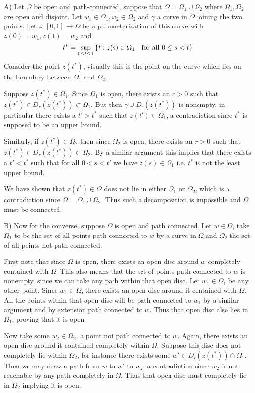 \begin{exercise}
	A) Let $\Omega$ be open and path-connected, suppose that $\Omega = \Omega_1 \cup \Omega_2$ where $\Omega_1, \Omega_2$ are open and disjoint. Let $w_1 \in \Omega_1, w_2 \in \Omega_2$ and $\gamma$ a curve in $\Omega$ joining the two points. Let $z: [0, 1] \to \Omega$ be a parameterization of this curve with $z(0) = w_1, z(1) = w_2$ and
	\[ t^* = \sup_{0 \leq t \leq 1} \left\{t : z(s) \in \Omega_1 \quad \text{for all } 0 \leq s < t\right\} \]
	Consider the point $z(t^*)$, visually this is the point on the curve which lies on the boundary between $\Omega_1$ and $\Omega_2$. 
	
	Suppose $z(t^*) \in \Omega_1$. Since $\Omega_1$ is open, there exists an $r > 0$ such that $z(t^*) \in D_r(z(t^*)) \subset \Omega_1$. But then $\gamma \cup D_r(z(t^*))$ is nonempty, in particular there exists a $t' > t^*$ such that $z(t') \in \Omega_1$, a contradiction since $t^*$ is supposed to be an upper bound.
	
	Similarly, if $z(t^*) \in \Omega_2$ then since $\Omega_2$ is open, there exists an $r > 0$ such that $z(t^*) \in D_r(z(t^*)) \subset \Omega_2$. By a similar argument this implies that there exists a $t' < t^*$ such that for all $0 < s < t'$ we have $z(s) \in \Omega_1$ i.e. $t^*$ is not the least upper bound. 
	
	We have shown that $z(t^*) \in \Omega$ does not lie in either $\Omega_1$ or $\Omega_2$, which is a contradiction since $\Omega = \Omega_1 \cup \Omega_2$. Thus such a decomposition is impossible and $\Omega$ must be connected.
	
	B) Now for the converse, suppose $\Omega$ is open and path connected. Let $w \in \Omega$, take $\Omega_1$ to be the set of all points path connected to $w$ by a curve in $\Omega$ and $\Omega_2$ the set of all points not path connected. 
	
	First note that since $\Omega$ is open, there exists an open disc around $w$ completely contained with $\Omega$. This also means that the set of points path connected to $w$ is nonempty, since we can take any path within that open disc. Let $w_1 \in \Omega_1$ be any other point. Since $w_1 \in \Omega$, there exists an open disc around it contained with $\Omega$. All the points within that open disc will be path connected to $w_1$ by a similar argument and by extension path connected to $w$. Thus that open disc also lies in $\Omega_1$, proving that it is open.
	
	Now take some $w_2 \in \Omega_2$, a point not path connected to $w$. Again, there exists an open disc around it contained completely within $\Omega$. Suppose this disc does not completely lie within $\Omega_2$, for instance there exists some $w' \in D_r(z(t^*)) \cap \Omega_1$. Then we may draw a path from $w$ to $w'$ to $w_2$, a contradiction since $w_2$ is not reachable by any path completely in $\Omega$. Thus that open disc must completely lie in $\Omega_2$ implying it is open.
	

\end{exercise}
